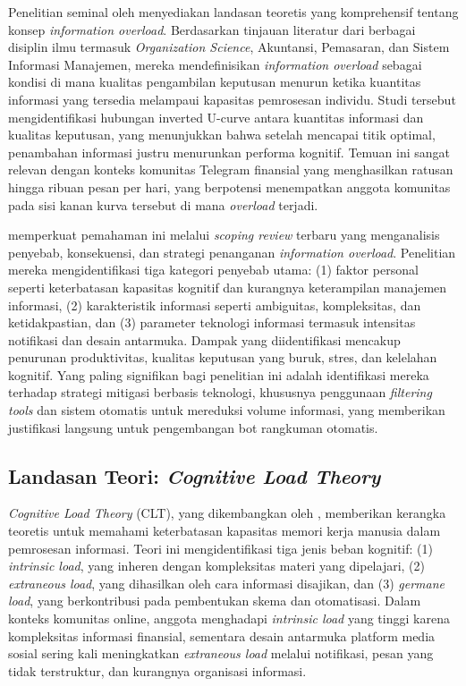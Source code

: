 Penelitian seminal oleh \textcite{eppler2004} menyediakan landasan teoretis yang komprehensif tentang konsep \textit{information overload}. Berdasarkan tinjauan literatur dari berbagai disiplin ilmu termasuk \textit{Organization Science}, Akuntansi, Pemasaran, dan Sistem Informasi Manajemen, mereka mendefinisikan \textit{information overload} sebagai kondisi di mana kualitas pengambilan keputusan menurun ketika kuantitas informasi yang tersedia melampaui kapasitas pemrosesan individu. Studi tersebut mengidentifikasi hubungan inverted U-curve antara kuantitas informasi dan kualitas keputusan, yang menunjukkan bahwa setelah mencapai titik optimal, penambahan informasi justru menurunkan performa kognitif. Temuan ini sangat relevan dengan konteks komunitas Telegram finansial yang menghasilkan ratusan hingga ribuan pesan per hari, yang berpotensi menempatkan anggota komunitas pada sisi kanan kurva tersebut di mana \textit{overload} terjadi.

\textcite{shahrzadi2024} memperkuat pemahaman ini melalui \textit{scoping review} terbaru yang menganalisis penyebab, konsekuensi, dan strategi penanganan \textit{information overload}. Penelitian mereka mengidentifikasi tiga kategori penyebab utama: (1) faktor personal seperti keterbatasan kapasitas kognitif dan kurangnya keterampilan manajemen informasi, (2) karakteristik informasi seperti ambiguitas, kompleksitas, dan ketidakpastian, dan (3) parameter teknologi informasi termasuk intensitas notifikasi dan desain antarmuka. Dampak yang diidentifikasi mencakup penurunan produktivitas, kualitas keputusan yang buruk, stres, dan kelelahan kognitif. Yang paling signifikan bagi penelitian ini adalah identifikasi mereka terhadap strategi mitigasi berbasis teknologi, khususnya penggunaan \textit{filtering tools} dan sistem otomatis untuk mereduksi volume informasi, yang memberikan justifikasi langsung untuk pengembangan bot rangkuman otomatis.

\subsection{Landasan Teori: \textit{Cognitive Load Theory}}

\textit{Cognitive Load Theory} (CLT), yang dikembangkan oleh \textcite{sweller1988}, memberikan kerangka teoretis untuk memahami keterbatasan kapasitas memori kerja manusia dalam pemrosesan informasi. Teori ini mengidentifikasi tiga jenis beban kognitif: (1) \textit{intrinsic load}, yang inheren dengan kompleksitas materi yang dipelajari, (2) \textit{extraneous load}, yang dihasilkan oleh cara informasi disajikan, dan (3) \textit{germane load}, yang berkontribusi pada pembentukan skema dan otomatisasi. Dalam konteks komunitas online, anggota menghadapi \textit{intrinsic load} yang tinggi karena kompleksitas informasi finansial, sementara desain antarmuka platform media sosial sering kali meningkatkan \textit{extraneous load} melalui notifikasi, pesan yang tidak terstruktur, dan kurangnya organisasi informasi.

